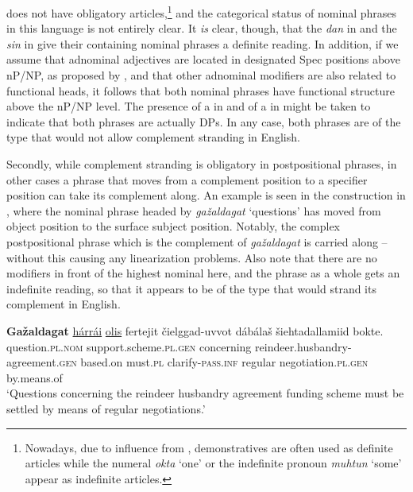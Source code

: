 \documentclass[output=paper]{LSP/langsci}
\begin{document}
 does not have obligatory articles,\footnote{Nowadays, due to influence from , demonstratives are often used as definite articles while the numeral \textit{okta} ‘one’ or the indefinite pronoun \textit{muhtun} ‘some’ appear as indefinite articles.} and the categorical status of nominal phrases in this language is not entirely clear. It \textit{is} clear, though, that the  \textit{dan} in  and the  \textit{sin} in  give their containing nominal phrases a definite reading. In addition, if we assume that adnominal adjectives are located in designated Spec positions above nP/NP, as proposed by \citet{Cinque1994,Cinque2010adjectives}, and that other adnominal modifiers are also related to functional heads, it follows that both nominal phrases have functional structure above the nP/NP level. The presence of a  in  and of a  in  might be taken to indicate that both phrases are actually DPs. In any case, both phrases are of the type that would not allow complement stranding in English.


Secondly, while complement stranding is obligatory in postpositional phrases, in other cases a phrase that moves from a complement position to a specifier position can take its complement along. An example is seen in the  construction in , where the nominal phrase headed by \textit{gažaldagat} ‘questions’ has moved from object position to the surface subject position. Notably, the complex postpositional phrase which is the complement of \textit{gažaldagat} is carried along – without this causing any linearization problems. Also note that there are no modifiers in front of the highest nominal here, and the phrase as a whole gets an indefinite reading, so that it appears to be of the type that would strand its complement in English.


\ea%
    \label{ex:julien:27}
   
    \gll    \textbf{Gažaldagat}                  \uline{hárrái}          \uline{olis}      fertejit    čielggad-uvvot  dábálaš   šiehtadallamiid    bokte. \\ 
  question.\textsc{pl}.\textsc{nom}    support.scheme.\textsc{pl.gen}    concerning  reindeer.husbandry-agreement.\textsc{gen}  based.on    must.\textsc{pl} clarify-\textsc{pass.inf} regular	 negotiation.\textsc{pl.gen}  by.means.of\\
    \glt ‘Questions concerning the reindeer husbandry agreement funding scheme must be settled by means of regular negotiations.’
    \z
\end{document}
